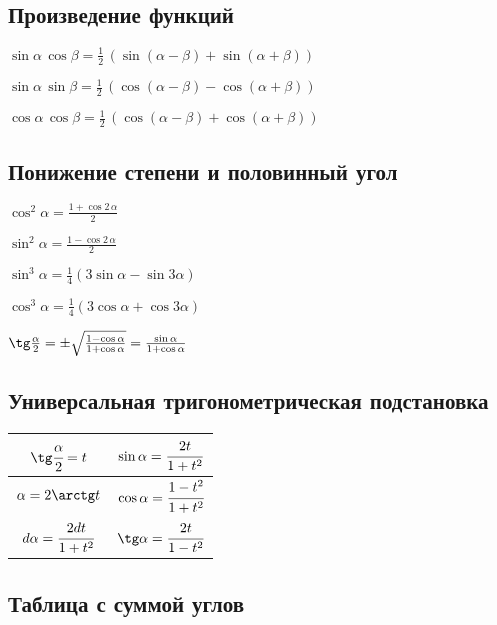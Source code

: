 \subsection{Произведение функций}

$ \sin \alpha\, \cos \beta = \frac{1}{2}\, (\sin (\alpha - \beta) + \sin (\alpha + \beta)) $

$ \sin \alpha\, \sin \beta = \frac{1}{2}\, (\cos (\alpha - \beta) - \cos (\alpha + \beta)) $

$ \cos \alpha\, \cos \beta = \frac{1}{2}\, (\cos (\alpha - \beta) + \cos (\alpha + \beta)) $

\subsection{Понижение степени и половинный угол}

$ \cos^2 \alpha = \frac{1 + \cos 2\, \alpha}{2} $

$ \sin^2 \alpha = \frac{1 - \cos 2\, \alpha}{2} $

$ \sin^3 \alpha = \frac14(3\sin \alpha - \sin 3 \alpha) $

$ \cos^3 \alpha = \frac14(3\cos \alpha + \cos 3 \alpha) $

$ \tg \frac{\alpha}{2} = \pm \sqrt{\mathstrut \frac{1 - \cos \alpha}{1 + \cos \alpha}} = \frac{\sin \alpha}{1 + \cos \alpha} $

\subsection{Универсальная тригонометрическая подстановка}

{\renewcommand{\arraystretch}{2}
\begin{tabular}[t]{||c|c||}
	\hline
		$ \tg \cfrac{\alpha}{2} = t $ & 		$ \sin \alpha = \cfrac{2t}{1 + t^2} $ \tabularnewline
	\hline
		$ \alpha = 2\arctg t $ & 		$ \cos \alpha = \cfrac{1 - t^2}{1 + t^2} $ \tabularnewline
	\hline
		$ d\alpha = \cfrac{2dt}{1+t^2}$ & 	$ \tg \alpha = \cfrac{2t}{1-t^2} $ \tabularnewline
	\hline
\end{tabular}}

\subsection{Таблица с суммой углов}

